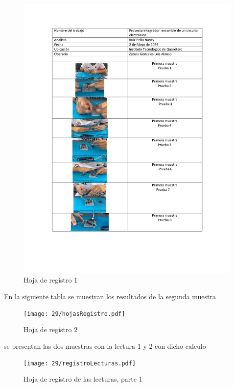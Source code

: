     \begin{figure}[H]
        \centering
        \includegraphics[scale=0.40]{29/img/hojaRegistros.pdf}
        \caption{Hoja de registro 1 }
        \label{fig:hojaRegistros.pdf}
    \end{figure}
    
    En la siguiente tabla se muestran los resultados de la segunda muestra
    \begin{figure}[H]
        \centering
        \texttt{[image: 29/hojasRegistro.pdf]}
        \caption{Hoja de registro 2 }
        \label{fig:hojasRegistro.pdf}
    \end{figure}
    se presentan las dos muestras con la lectura 1 y 2 con dicho calculo 
    \begin{figure}[H]
        \centering
        \texttt{[image: 29/registroLecturas.pdf]}
        \caption{Hoja de registro de las lecturas, parte 1  }
        \label{fig:registroLecturas.pdf}
    \end{figure}
    
